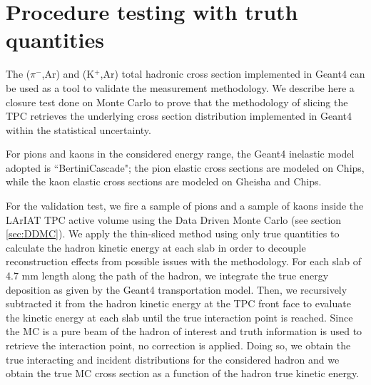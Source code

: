 




\section{Procedure testing with truth quantities}\label{ch:procedureTesting}
The ($\pi^{-}$,Ar) and (K$^{+}$,Ar) total hadronic cross section implemented in Geant4 can be used as a tool to validate the measurement methodology.  We describe here a closure test done on Monte Carlo to prove that the methodology of slicing the TPC retrieves the underlying cross section distribution implemented in Geant4 within the statistical uncertainty. %

For pions and kaons in the considered energy range, the Geant4 inelastic model adopted is ``BertiniCascade"; the pion elastic cross sections are modeled on Chips, while the kaon elastic cross sections are modeled on Gheisha and Chips.

For the validation test, we fire a sample of pions and a sample of kaons inside the LArIAT TPC active volume using the Data Driven Monte Carlo (see section \ref{sec:DDMC}). We apply  the thin-sliced method using only true quantities to calculate the hadron kinetic energy at each slab in order to decouple reconstruction effects from possible issues with the methodology.  For each slab of 4.7 mm length along the path of the hadron, we integrate the true energy deposition as given by the Geant4 transportation model. Then, we recursively subtracted it from the hadron kinetic energy at the TPC front face to evaluate the kinetic energy at each slab until the true interaction point is reached. Since the MC is a pure beam of the hadron of interest and truth information is used to retrieve the interaction point, no correction is applied. Doing so, we obtain the true interacting and incident distributions for the considered hadron and we obtain the true MC cross section as a function of the hadron true kinetic energy. 

